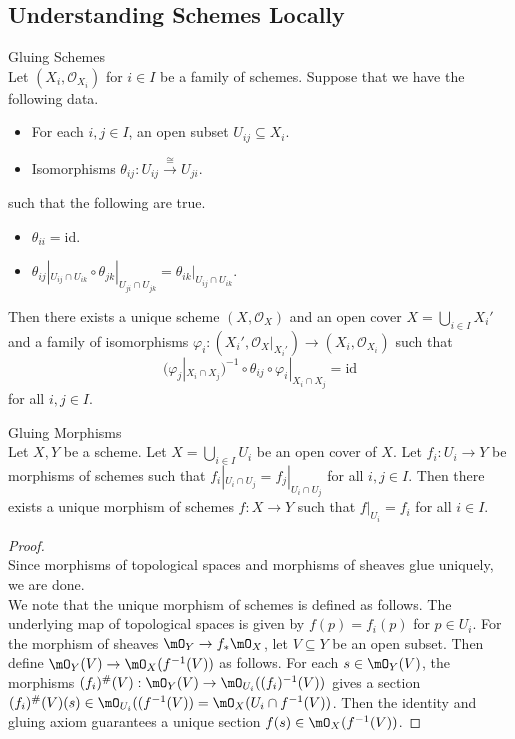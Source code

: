 \documentclass[a4paper]{article}
\begin{document}
\subsection{Understanding Schemes Locally}
\begin{thm}{Gluing Schemes}{}\\
Let $(X_i,\mathcal{O}_{X_i})$ for $i\in I$ be a family of schemes. Suppose that we have the following data. 
\begin{itemize}
\item For each $i,j\in I$, an open subset $U_{ij}\subseteq X_i$. 
\item Isomorphisms $\theta_{ij}:U_{ij}\overset{\cong}{\to}U_{ji}$. 
\end{itemize}
such that the following are true. 
\begin{itemize}
\item $\theta_{ii}=\text{id}$. 
\item $\theta_{ij}|_{U_{ij}\cap U_{ik}}\circ\theta_{jk}|_{U_{ji}
\cap U_{jk}}=\theta_{ik}|_{U_{ij}\cap U_{ik}}$. 
\end{itemize}
Then there exists a unique scheme $(X,\mathcal{O}_X)$ and an open cover $X=\bigcup_{i\in I}X_i'$ and a family of isomorphisms $\varphi_i:(X_i',\mathcal{O}_X|_{X_i'})\to(X_i,\mathcal{O}_{X_i})$ such that $$(\varphi_j|_{X_i\cap X_j})^{-1}\circ\theta_{ij}\circ\varphi_i|_{X_i\cap X_j}=\text{id}$$ for all $i,j\in I$. 
\end{thm}

\begin{prp}{Gluing Morphisms}{}\\
Let $X,Y$ be a scheme. Let $X=\bigcup_{i\in I}U_i$ be an open cover of $X$. Let $f_i:U_i\to Y$ be morphisms of schemes such that $f_i|_{U_i\cap U_j}=f_j|_{U_i\cap U_j}$ for all $i,j\in I$. Then there exists a unique morphism of schemes $f:X\to Y$ such that $f|_{U_i}=f_i$ for all $i\in I$. 
\begin{proof}\\
Since morphisms of topological spaces and morphisms of sheaves glue uniquely, we are done. \\

We note that the unique morphism of schemes is defined as follows. The underlying map of topological spaces is given by $f(p)=f_i(p)$ for $p\in U_i$. For the morphism of sheaves $\mO_Y\to f_\ast\mO_X$, let $V\subseteq Y$ be an open subset. Then define $\mO_Y(V)\to\mO_X(f^{-1}(V))$ as follows. For each $s\in\mO_Y(V)$, the morphisms $(f_i)^\#(V):\mO_Y(V)\to\mO_{U_i}((f_i)^{-1}(V))$ gives a section $(f_i)^\#(V)(s)\in\mO_{U_i}((f^{-1}(V))=\mO_X(U_i\cap f^{-1}(V))$. Then the identity and gluing axiom guarantees a unique section $f(s)\in\mO_X(f^{-1}(V))$. 
\end{proof}
\end{prp}
\end{document}
